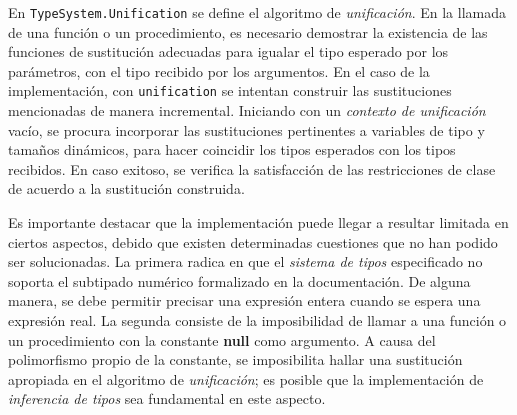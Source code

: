 En \lstinline[style = module]{TypeSystem.Unification} se define el algoritmo de \textit{unificación}.
En la llamada de una función o un procedimiento, es necesario demostrar la existencia de las funciones de sustitución adecuadas para igualar el tipo esperado por los parámetros, con el tipo recibido por los argumentos.
En el caso de la implementación, con \lstinline[style = haskell]{unification} se intentan construir las sustituciones mencionadas de manera incremental.
Iniciando con un \textit{contexto de unificación} vacío, se procura incorporar las sustituciones pertinentes a variables de tipo y tamaños dinámicos, para hacer coincidir los tipos esperados con los tipos recibidos.
En caso exitoso, se verifica la satisfacción de las restricciones de clase de acuerdo a la sustitución construida.

Es importante destacar que la implementación puede llegar a resultar limitada en ciertos aspectos, debido que existen determinadas cuestiones que no han podido ser solucionadas.
La primera radica en que el \textit{sistema de tipos} especificado no soporta el subtipado numérico formalizado en la documentación.
De alguna manera, se debe permitir precisar una expresión entera cuando se espera una expresión real.
La segunda consiste de la imposibilidad de llamar a una función o un procedimiento con la constante \textbf{null} como argumento.
A causa del polimorfismo propio de la constante, se imposibilita hallar una sustitución apropiada en el algoritmo de \textit{unificación}; es posible que la implementación de \textit{inferencia de tipos} sea fundamental en este aspecto.

\iffalse
yo diría que si usaste como guía bastante del paper

podes arrancar contando un poco en general la implementación completa

sin entrar en muchos detalles, quizá contando que mónadas usas, etc

digo, un párrafo largo podría alcanzar

y para cerrar podes mencionar esto, un poco de que trata cada módulo a modo de documentación
%
en resumen:
- Daría una presentación general de la implementación utilizando al paper como base. Es decir, por ejemplo comentando qué  features implementa el typechecker y cómo; acá entra contar sobre las mónadas, etc. Una forma de verla a esta parte es un pequeño resumen del paper mezclado por supuesto con tu implementación digamos.
- Una parte final de más documentación donde contás tanto como quieras de que trata cada módulo, o los módulos relevantes

podría ser una sección no muy larga, donde el foco para mi debería estar en plasmar la arquitectura general del typechecker
\fi
\iffalse
-- Constructor Functions
emptyBT :: Backtrace
emptyBT = BT []

push :: BTNode -> Backtrace -> Backtrace
push btn (BT btns) = BT (btn : btns)

pop :: Backtrace -> Backtrace
pop (BT btns) = BT (tail btns)
\fi